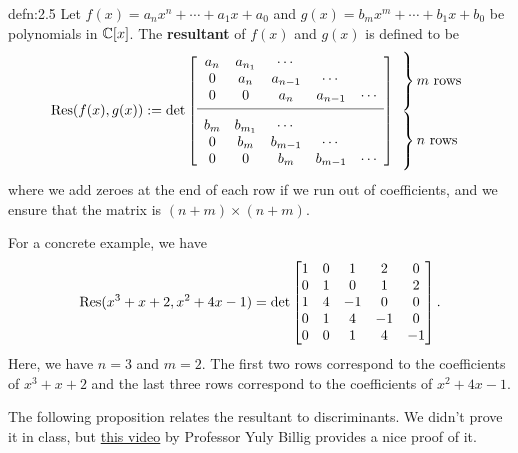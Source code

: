 \begin{defn}{defn:2.5}
    Let $f(x) = a_n x^n + \cdots + a_1 x + a_0$ and $g(x) = b_m x^m 
    + \cdots + b_1 x + b_0$ be polynomials in $\mathbb{C}[x]$. The {\bf resultant}
    of $f(x)$ and $g(x)$ is defined to be 
    \[ \Res(f(x), g(x)) := \det\,\mleft[ \begin{array}{ccccc}
        a_n & a_{n_1} & \cdots & & \\
        0 & a_n & a_{n-1} & \cdots & \\ 
        0 & 0 & a_n & a_{n-1} & \cdots \\[3pt] \hline
        \\[-6pt]
        b_m & b_{m_1} & \cdots & & \\
        0 & b_m & b_{m-1} & \cdots & \\ 
        0 & 0 & b_m & b_{m-1} & \cdots \\
    \end{array} \mright]
    \begin{array}{l}
        \left.\vphantom{\begin{matrix} 0 \\ \vdots \\ 0 \end{matrix}}\right\} m \text{ rows} \\ 
        \left.\vphantom{\begin{matrix} 0 \\ \vdots \\ 0 \end{matrix}}\right\} n \text{ rows}
    \end{array} \]
    where we add zeroes at the end of each row if we run out of coefficients, 
    and we ensure that the matrix is $(n+m) \times (n+m)$. 
\end{defn}

For a concrete example, we have 
\[ \operatorname{Res}(x^3 + x + 2, x^2 + 4x - 1) = \det \begin{bmatrix} 
    1 & 0 & 1 & 2 & 0 \\ 
    0 & 1 & 0 & 1 & 2 \\ 
    1 & 4 & -1 & 0 & 0 \\ 
    0 & 1 & 4 & -1 & 0 \\ 
    0 & 0 & 1 & 4 & -1
\end{bmatrix}. \] 
Here, we have $n = 3$ and $m = 2$. The first two rows correspond to the 
coefficients of $x^3 + x + 2$ and the last three rows correspond to the 
coefficients of $x^2 + 4x - 1$. 

The following proposition relates the resultant to discriminants. We didn't
prove it in class, but \href{https://www.youtube.com/watch?v=5YNje7ZIaEM}{this video}
by Professor Yuly Billig provides a nice proof of it. 

